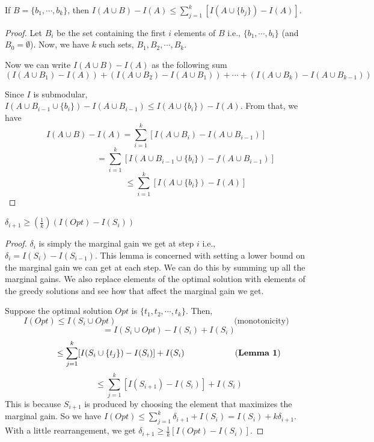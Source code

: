 \noindent
\begin{lemma}
If $B=\{b_{1},\cdots, b_{k}\}$, then $I(A\cup B)-I(A)\leq \sum_{j=1}^{k} [I(A\cup\{b_{j}\})-I(A)] $.
\end{lemma}

\begin{proof}
Let $B_{i}$ be the set containing the first $i$ elements of $B$ i.e., $\{b_{1},\cdots,b_{i}\}$ (and $B_{0}=\emptyset$). Now, we have $k$ such sets, $B_{1},B_{2},\cdots, B_{k}$.

\noindent
Now we can write $I(A\cup B)-I(A)$ as the following sum 
$$
\left( I(A\cup B_{1}) - I(A)\right) + \left( I(A\cup B_{2}) - I(A\cup B_{1})\right)+\cdots+\left( I(A\cup B_{k}) - I(A\cup B_{k-1})\right)
$$

\noindent
Since $I$ is submodular, $I(A\cup B_{i-1}\cup \{b_{i}\}) - I(A\cup B_{i-1})\leq I(A\cup \{b_{i}\})-I(A)$. From that, we have 
$$
I(A\cup B) - I(A) = \sum_{i=1}^{k}[I(A\cup B_{i})-I(A\cup B_{i-1})] 
$$
$$
\qquad\qquad\qquad\quad= \sum_{i=1}^{k}[I(A\cup B_{i-1}\cup\{b_{i}\}) -f(A\cup B_{i-1})]
$$
$$
\qquad\qquad\qquad\quad\leq \sum_{i=1}^{k}[I(A\cup \{b_{i}\})-I(A)]
$$
\end{proof}

\begin{lemma}
$\delta_{i+1} \geq (\frac{1}{k})(I(Opt)-I(S_{i}))$
\end{lemma}

\begin{proof}
$\delta_{i}$ is simply the marginal gain we get at step $i$ i.e., $\delta_{i}=I(S_{i})-I(S_{i-1})$. This lemma is concerned with setting a lower bound on the marginal gain we can get at each step. We can do this by summing up all the marginal gains. We also replace elements of the optimal solution with elements of the greedy solutions and see how that affect the marginal gain we get. 


\noindent
Suppose the optimal solution $Opt$ is $\{t_{1}, t_{2},\cdots,t_{k}\}$. Then, 
$$
I(Opt)\leq I(S_{i}\cup Opt) \qquad \qquad \qquad \qquad \qquad \qquad  \qquad \text{(monotonicity)}
$$
$$
\qquad\quad  = I(S_{i}\cup Opt) - I(S_{i}) + I(S_{i})
$$
$$
\qquad\quad  \leq \sum_{j=1}^{k}[I(S_{i}\cup \{t_{j}\})-I(S_{i})] + I(S_{i}) \qquad \qquad \qquad \text{(\textbf{Lemma 1})}
$$
$$
\qquad\quad \leq \sum_{j=1}^{k}[I(S_{i+1})-I(S_{i})] + I(S_{i})
$$
This is because $S_{i+1}$ is produced by choosing the element that maximizes the marginal gain. So we have $I(Opt)\leq \sum_{j=1}^{k}\delta_{i+1}+I(S_{i})=I(S_{i})+k\delta_{i+1}$. With a little rearrangement, we get $\delta_{i+1}\geq \frac{1}{k}[I(Opt)-I(S_{i})]$.
\end{proof}



